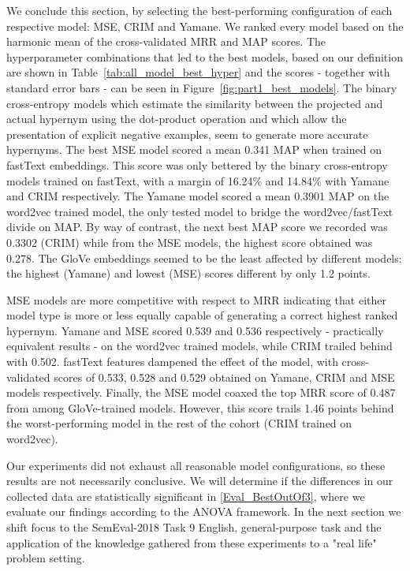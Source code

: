 We conclude this section, by selecting the best-performing configuration of each respective model: \ac{MSE}, CRIM and Yamane.  We ranked every model based on the harmonic mean of the cross-validated \ac{MRR} and \ac{MAP} scores.  The hyperparameter combinations that led to the best models, based on our definition are shown in Table~\ref{tab:all_model_best_hyper} and the scores - together with standard error bars - can be seen in Figure~\ref{fig:part1_best_models}.  The binary cross-entropy models which estimate the similarity between the projected and actual hypernym using the dot-product operation and which allow the presentation of explicit negative examples, seem to generate more accurate hypernyms.  The best \ac{MSE} model scored a mean 0.341 \ac{MAP} when trained on fastText embeddings.  This score was only bettered by the binary cross-entropy models trained on fastText, with a margin of 16.24\% and 14.84\% with Yamane and CRIM respectively.  The Yamane model scored a mean 0.3901 \ac{MAP} on the word2vec trained model, the only tested model to bridge the word2vec/fastText divide on \ac{MAP}.  By way of contrast, the next best \ac{MAP} score we recorded was 0.3302 (CRIM) while from the \ac{MSE} models, the highest score obtained was 0.278.  The GloVe embeddings seemed to be the least affected by different models: the highest (Yamane) and lowest (MSE) scores different by only 1.2 points.

\ac{MSE} models are more competitive with respect to \ac{MRR} indicating that either model type is more or less equally capable of generating a correct highest ranked hypernym.  Yamane and MSE scored 0.539 and 0.536 respectively - practically equivalent results - on the word2vec trained models, while CRIM trailed behind with 0.502.  fastText features dampened the effect of the model, with cross-validated scores of 0.533, 0.528 and 0.529 obtained on Yamane, CRIM and MSE models respectively.  Finally, the MSE model coaxed the top \ac{MRR} score of 0.487 from among GloVe-trained models.  However, this score trails 1.46 points behind the worst-performing model in the rest of the cohort (CRIM trained on word2vec).

Our experiments did not exhaust all reasonable model configurations, so these results are not necessarily conclusive.  We will determine if the differences in our collected data are statistically significant in \cref{Eval_BestOutOf3}, where we evaluate our findings according to the \ac{ANOVA} framework.  In the next section we shift focus to the SemEval-2018 Task 9 English, general-purpose task and the application of the knowledge gathered from these experiments to a "real life" problem setting.

